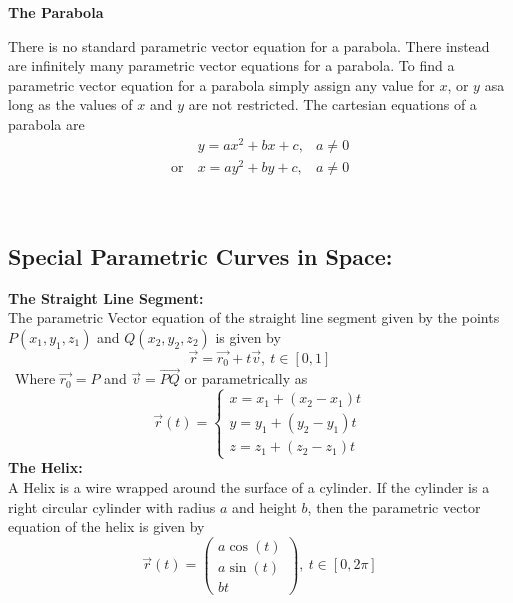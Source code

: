 \documentclass[14pt]{article}
\begin{document}
    \textbf{The Parabola}
    \begin{multicols}{2}
        There is no standard parametric vector equation for a parabola. There instead are infinitely many parametric vector equations for a parabola. To find a parametric vector equation for a parabola simply assign any value for $x$, or $y$ asa long as the values of $x$ and $y$ are not restricted. The cartesian equations of a parabola are
        \begin{align*}
            &y=ax^2+bx+c,& a\neq 0\\
            \mathrm{or}\ & x=ay^2+by+c,& a\neq 0
        \end{align*}
        \\
    \end{multicols}
    \subsection{Special Parametric Curves in Space:}
    \textbf{The Straight Line Segment:}\\
    The parametric Vector equation of the straight line segment given by the points $P(x_1, y_1, z_1)$ and $Q(x_2, y_2, z_2)$ is given by 
    $$\vec r= \vec{r_0}+t\vec v,\ t\in[0,1]$$\
    Where $\vec{r_0}=P$ and $\vec v=\vec{PQ}$ or parametrically as
    $$\vec r(t)=\left\{\begin{array}{lr}
        x=x_1+(x_2-x_1)t\\
        y=y_1+(y_2-y_1)t\\
        z=z_1+(z_2-z_1)t
    \end{array}\right.$$
    \textbf{The Helix:}\\
    A Helix is a wire wrapped around the surface of a cylinder. If the cylinder is a right circular cylinder with radius $a$ and height $b$, then the parametric vector equation of the helix is given by
    $$\vec r(t)=\begin{pmatrix}
        a\cos(t)\\
        a\sin(t)\\
        bt
    \end{pmatrix},\ t\in[0,2\pi]$$
\end{document}
